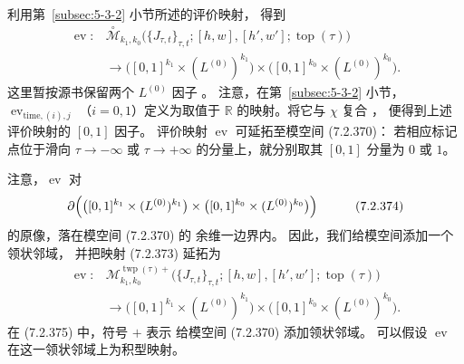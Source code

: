 
利用第~\ref{subsec:5-3-2} 小节所述的评价映射，
得到
\begin{equation}
\begin{aligned}
\operatorname{ev}\colon{}
&\overset{\circ}{\mathcal M}_{k_1,k_0}
\bigl(\{J_{\tau,t}\}_{\tau,t};
[h,w],[h',w'];\operatorname{top}(\tau)\bigr)
\\
&\longrightarrow
\bigl([0,1]^{k_1}\times(L^{(0)})^{k_1}\bigr)
\times
\bigl([0,1]^{k_0}\times(L^{(0)})^{k_0}\bigr).
\end{aligned}
\tag{7.2.373}\label{eq:7-2-373}
\end{equation}
这里暂按源书保留两个 $L^{(0)}$ 因子
。
注意，在第~\ref{subsec:5-3-2} 小节，
$\operatorname{ev}_{\mathrm{time},(i),j}$
（$i=0,1$）定义为取值于 $\mathbb R$
的映射。将它与 $\chi$ 复合
，
便得到上述评价映射的 $[0,1]$ 因子。
评价映射 $\operatorname{ev}$
可延拓至模空间 (7.2.370)：
若相应标记点位于滑向
$\tau\to-\infty$ 或 $\tau\to+\infty$
的分量上，就分别取其 $[0,1]$ 分量为
$0$ 或 $1$。

注意，$\operatorname{ev}$ 对
\begin{equation}
\begin{aligned}
\partial\Bigl(
&\bigl([0,1]^{k_1}\times(L^{(0)})^{k_1}\bigr)
\times
\bigl([0,1]^{k_0}\times(L^{(0)})^{k_0}\bigr)
\Bigr)
\end{aligned}
\tag{7.2.374}\label{eq:7-2-374}
\end{equation}
的原像，落在模空间 (7.2.370) 的
余维一边界内。
因此，我们给模空间添加一个领状邻域，
并把映射 (7.2.373)
延拓为
\begin{equation}
\begin{aligned}
\operatorname{ev}\colon{}
&\mathcal M_{k_1,k_0}^{\operatorname{twp}(\tau)+}
\bigl(\{J_{\tau,t}\}_{\tau,t};
[h,w],[h',w'];\operatorname{top}(\tau)\bigr)
\\
&\longrightarrow
\bigl([0,1]^{k_1}\times(L^{(0)})^{k_1}\bigr)
\times
\bigl([0,1]^{k_0}\times(L^{(0)})^{k_0}\bigr).
\end{aligned}
\tag{7.2.375}\label{eq:7-2-375}
\end{equation}
在 (7.2.375) 中，符号 $+$ 表示
给模空间 (7.2.370) 添加领状邻域。
可以假设 $\operatorname{ev}$
在这一领状邻域上为积型映射。

